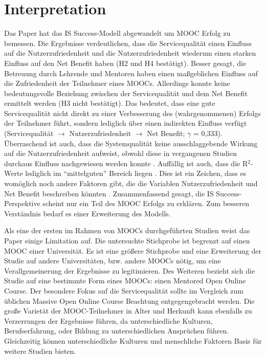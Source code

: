 \section{Interpretation}
\label{sec:vergleich}
Das Paper hat das IS Success-Modell abgewandelt um MOOC Erfolg zu bemessen.  
Die Ergebnisse verdeutlichen, dass die Servicequalität einen Einfluss auf die Nutzerzufriedenheit und die Nutzerzufriedenheit wiederum einen starken Einfluss auf den Net Benefit haben (H2 und H4 bestätigt). Besser gesagt, die Betreuung durch Lehrende und Mentoren haben einen maßgeblichen Einfluss auf die Zufriedenheit der Teilnehmer eines MOOCs. Allerdings konnte keine bedeutungsvolle Beziehung zwischen der Servicequalität und dem Net Benefit ermittelt werden (H3 nicht bestätigt). Das bedeutet, dass eine gute Servicequalität nicht direkt zu einer Verbesserung des (wahrgenommenen) Erfolgs der Teilnehmer führt, sondern lediglich über einen indirekten Einfluss verfügt (Servicequalität $\rightarrow$ Nutzerzufriedenheit $\rightarrow$ Net Benefit; $\gamma$ = 0,333). Überraschend ist auch, dass die Systemqualität keine ausschlaggebende Wirkung auf die Nutzerzufriedenheit aufweist, obwohl diese in vergangenen Studien durchaus Einfluss nachgewiesen werden konnte \parencite{freeze2010success, islam2013investigating, mohammadi2015factors}. 
Auffällig ist auch, dass die R$^2$-Werte lediglich im "`mittelguten"' Bereich liegen \parencite[vgl.][S.323]{chin1998partial}. Dies ist ein Zeichen, dass es womöglich noch andere Faktoren gibt, die die Variablen Nutzerzufriedenheit und Net Benefit beschreiben könnten \parencite[vgl.][S.179]{freeze2010success}.  
Zusammenfassend gesagt, die IS Success-Perspektive scheint nur ein Teil des MOOC Erfolgs zu erklären. Zum besseren Verständnis bedarf es einer Erweiterung des Modells. \newline 

Als eine der ersten im Rahmen von MOOCs durchgeführten Studien weist das Paper einige Limitation auf. Die untersuchte Stichprobe ist begrenzt auf einen MOOC einer Universität. Es ist eine größere Stichprobe und eine Erweiterung der Studie auf andere Universitäten, bzw. andere MOOCs nötig, um eine Verallgemeinerung der Ergebnisse zu legitimieren. Des Weiteren bezieht sich die Studie auf eine bestimmte Form eines MOOCs: einen Mentored Open Online Course. Der besondere Fokus auf die Servicequalität sollte im Vergleich zum üblichen Massive Open Online Course Beachtung entgegengebracht werden. Die große Varietät der MOOC-Teilnehmer in Alter und Herkunft kann ebenfalls zu Verzerrungen der Ergebnisse führen, da unterschiedliche Kulturen, Berufserfahrung, oder Bildung zu unterschiedlichen Ansprüchen führen. Gleichzeitig können unterschiedliche Kulturen und menschliche Faktoren Basis für weitere Studien bieten.

